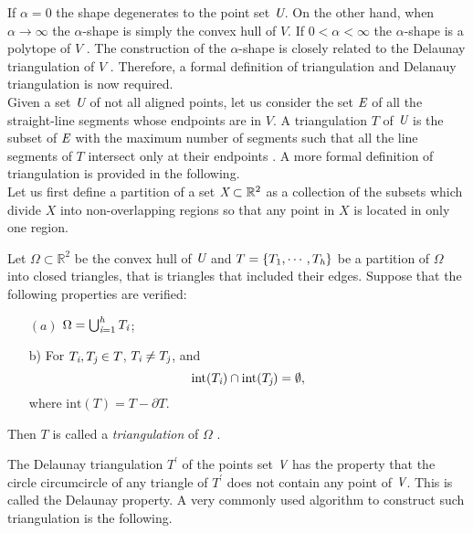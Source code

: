 If $\alpha = 0$ the shape degenerates to the point set $\emph{U}$. On the other hand, when $\alpha\rightarrow\infty$ the $\alpha$-shape is simply the convex hull of $V$. If $0<\alpha<\infty$ the $\alpha$-shape is a polytope of $V$ \cite{edelsbrunner1994three}. The construction of the $\alpha$-shape is closely related to the Delaunay triangulation of $V$ \cite{mucke1993shapes}. Therefore, a formal definition of triangulation and Delanauy triangulation is now required. \\ \indent
Given a set $\emph{U}$ of not all aligned points, let us consider the set $\emph{E}$ of all the straight-line segments whose endpoints are in $V$. 
A triangulation $T$ of $\emph{U}$ is the subset of $\emph{E}$ with the maximum number of segments such that all the line segments of $T$ intersect only at their endpoints \cite{lloyd1977triangulations}. 
A more formal definition of triangulation is provided in the following.
\\ \indent Let us first define a partition of a set $\emph{X}\subset \mathbb{R}^2$ as a collection of the subsets which divide $X$ into non-overlapping regions so that any point in $X$ is located in only one region. 
\begin{definition} \indent Let $\Omega\subset \mathbb{R}^2$ be the convex hull of $\emph{U}$ and $T = \{T_1, \cdots, T_{\textit{h}}\}$ be a partition of $\Omega$ into closed triangles, that is triangles that included their edges. Suppose that the following properties are verified:
\begin{itemize}
\item[$(a)$] $\Omega = \bigcup_{\textit{i} = 1}^{\textit{h}}T_{\textit{i}}$;
\item[b)] For $T_{\textit{i}}, T_{\textit{j}} \in T$, $T_{\textit{i}} \neq T_{\textit{j}}$, and 
\begin{equation*}
\textrm{int}(T_{\textit{i}})\cap \textrm{int}(T_{\textit{j}}) = \emptyset,
\end{equation*}
where $\textrm{int}(T) = T-\partial T$.
\end{itemize}
Then $T$ is called a \textit{triangulation} of $\Omega$ \cite{Numericalmethods}.
\end{definition}
The Delaunay triangulation $T^{\prime}$ of the points set $\emph{V}$ has the property that the circle circumcircle of any triangle of $T^{\prime}$ does not contain any point of $\emph{V}$. This is called the Delaunay property. A very commonly used algorithm to construct such triangulation is the following.\\ \indent 
